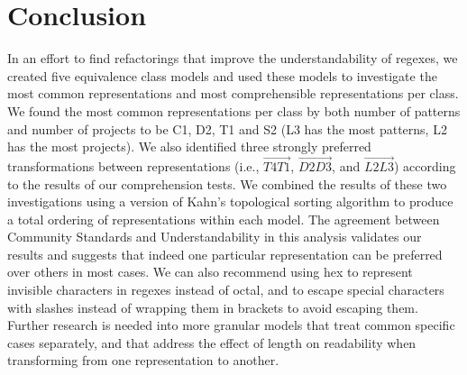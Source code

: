 
\section{Conclusion}
In an effort to find refactorings that improve the understandability of regexes, we created five equivalence class models and used these models to investigate the most common representations and most comprehensible representations per class.  We found the most common representations per class by both number of patterns and number of projects to be C1, D2, T1 and S2 (L3 has the most patterns, L2 has the most projects).
We also identified three strongly preferred transformations between representations (i.e., $\overrightarrow{T4 T1}$, $\overrightarrow{D2 D3}$, and  $\overrightarrow{L2 L3}$) according to the results of our comprehension tests.  We combined the results of these two investigations using a version of Kahn's topological sorting algorithm to produce a total ordering of representations within each model.  The agreement between Community Standards and Understandability in this analysis validates our results and suggests that indeed one particular representation can be preferred over others in most cases.  We can also recommend using hex to represent invisible characters in regexes instead of octal, and to escape special characters with slashes instead of wrapping them in brackets to avoid escaping them.  Further research is needed into more granular models that treat common specific cases separately, and that address the effect of length on readability when transforming from one representation to another.

